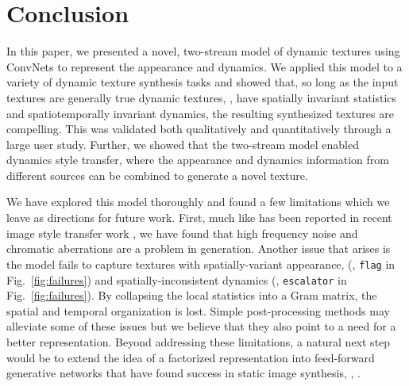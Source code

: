 \chapter{Conclusion }
In this paper, we presented a novel, two-stream model
of dynamic textures using ConvNets to represent the appearance and
dynamics.
We applied this model to a variety of dynamic texture synthesis
tasks and showed that, so long as the input textures are generally
true dynamic textures, \ie, have spatially invariant statistics and
spatiotemporally invariant dynamics, the resulting synthesized 
textures are compelling.
This was validated both qualitatively and quantitatively through
a large user study.
Further, we showed that the two-stream model enabled dynamics
style transfer, where the appearance and dynamics 
information from different sources can be combined to generate
a novel texture.

We have explored this model thoroughly and found a few limitations which we leave as directions for future work.
First, much like has been reported in recent image style transfer
work \cite{gatys2016image}, we have found that high frequency
noise and chromatic aberrations are a problem in generation.
Another issue that arises is the model fails to capture
textures with spatially-variant appearance, (\eg, 
\texttt{flag} in Fig.\ \ref{fig:failures}) and
spatially-inconsistent dynamics (\eg, \texttt{escalator} in 
Fig.\ \ref{fig:failures}).
By collapsing the local statistics into a Gram matrix, 
the spatial and temporal organization is lost.
Simple post-processing methods may alleviate some of these issues
but we believe that they also point to a need for a better
representation.
Beyond addressing these limitations, a natural next step would be
to extend the idea of a factorized representation into feed-forward
generative networks that have found success in static image
synthesis, \eg, \cite{johnson2016,ulyanov2016}.